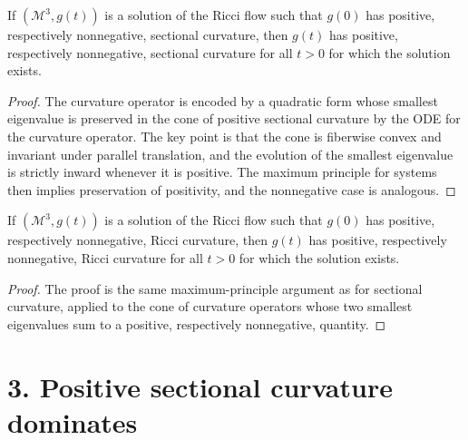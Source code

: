 \begin{lemma}
\label{ch09-lem-positive-sectional-curvature-preserved}

If \((\mathcal M^3,g(t))\) is a solution of the Ricci flow such that \(g(0)\) has positive, respectively nonnegative, sectional curvature, then \(g(t)\) has positive, respectively nonnegative, sectional curvature for all \(t>0\) for which the solution exists.
\end{lemma}

\begin{proof}
\sketch The curvature operator is encoded by a quadratic form whose smallest eigenvalue is preserved in the cone of positive sectional curvature by the ODE for the curvature operator. The key point is that the cone is fiberwise convex and invariant under parallel translation, and the evolution of the smallest eigenvalue is strictly inward whenever it is positive. The maximum principle for systems then implies preservation of positivity, and the nonnegative case is analogous.
\end{proof}

\begin{lemma}
\label{ch09-lem-positive-ricci-curvature-preserved}

If \((\mathcal M^3,g(t))\) is a solution of the Ricci flow such that \(g(0)\) has positive, respectively nonnegative, Ricci curvature, then \(g(t)\) has positive, respectively nonnegative, Ricci curvature for all \(t>0\) for which the solution exists.
\end{lemma}

\begin{proof}
\sketch The proof is the same maximum-principle argument as for sectional curvature, applied to the cone of curvature operators whose two smallest eigenvalues sum to a positive, respectively nonnegative, quantity.
\end{proof}

\section*{3. Positive sectional curvature dominates}


